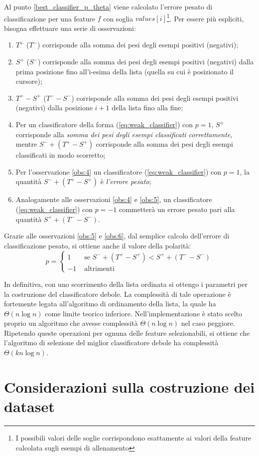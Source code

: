 \documentclass[a4paper,11pt,oneside]{article}
\begin{document}
			Al punto \ref{best_classifier_p_theta} viene calcolato l'errore pesato di classificazione per una feature $f$ con soglia $values[i]$\footnote{I possibili valori delle soglie corrispondono esattamente ai valori della feature calcolata sugli esempi di allenamento}. Per essere più espliciti, bisogna effettuare una serie di osservazioni:
			\begin{enumerate}
				\item \label{obs:1} $T^+$ ($T^-$) corrisponde alla somma dei pesi degli esempi positivi (negativi);
				\item \label{obs:2} $S^+$ ($S^-$) corrisponde alla somma dei pesi degli esempi positivi (negativi) dalla prima posizione fino all'i-esima della lista (quella su cui è posizionato il cursore);
				\item \label{obs:3} $T^+ - S^+$ ($T^- - S^-$) corrisponde alla somma dei pesi degli esempi positivi (negativi) dalla posizione $i+1$ della lista fino alla fine;
				\item \label{obs:4} Per un classificatore della forma (\ref{eq:weak_classifier}) con $p = 1$, $S^+$ corrisponde alla \emph{somma dei pesi degli esempi classificati correttamente}, mentre $S^- + (T^+ - S^+)$ corrisponde alla somma dei pesi degli esempi classificati in modo scorretto;
				\item \label{obs:5} Per l'osservazione \ref{obs:4} un classificatore (\ref{eq:weak_classifier}) con $p = 1$, la quantità $S^- + (T^+ - S^+)$ è \emph{l'errore pesato};
				\item \label{obs:6} Analogamente alle osservazioni \ref{obs:4} e \ref{obs:5}, un classificatore (\ref{eq:weak_classifier}) con $p = -1$ commetterà un errore pesato pari alla quantità $S^+ + (T^- - S^-)$.
			\end{enumerate}

			Grazie alle osservazioni \ref{obs:5} e \ref{obs:6}, dal semplice calcolo dell'errore di classificazione pesato, si ottiene anche il valore della polarità:
			\begin{equation}
				p = \begin{cases}
					1 & \text{ se } S^- + (T^+ - S^+) < S^+ + (T^- - S^-) \\
					-1 & \text{ altrimenti }
				\end{cases}
			\end{equation}

			In definitiva, con uno scorrimento della lista ordinata si ottengo i parametri per la costruzione del classificatore debole. La complessità di tale operazione è fortemente legata all'algoritmo di ordinamento della lista, la quale ha $\Theta(n\log n)$ come limite teorico inferiore. Nell'implementazione è stato scelto proprio un algoritmo che avesse complessità $\Theta(n\log n)$ nel caso peggiore. Ripetendo queste operazioni per ognuna delle feature selezionabili, si ottiene che l'algoritmo di selezione del miglior classificatore debole ha complessità $\Theta(kn\log n)$.

		


	\section{Considerazioni sulla costruzione dei dataset} %
	\label{sec:considerazioni_sulla_costruzione_dei_dataset}
	
\end{document}
